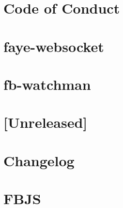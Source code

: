 \documentclass[twoside]{book}
\newcommand{\+}{\discretionary{\mbox{\scriptsize$\hookleftarrow$}}{}{}}
\begin{document}
\chapter{Code of Conduct}
\label{md__c_1_workspace_demo_src_main_script_node_modules_faye-websocket__c_o_d_e__o_f__c_o_n_d_u_c_t}

\chapter{faye-\/websocket}
\label{md__c_1_workspace_demo_src_main_script_node_modules_faye-websocket__r_e_a_d_m_e}

\chapter{fb-\/watchman}
\label{md__c_1_workspace_demo_src_main_script_node_modules_fb-watchman__r_e_a_d_m_e}

\chapter{\mbox{[}Unreleased\mbox{]}}
\label{md__c_1_workspace_demo_src_main_script_node_modules_fbjs__c_h_a_n_g_e_l_o_g}

\chapter{Changelog}
\label{md__c_1_workspace_demo_src_main_script_node_modules_fbjs_node_modules_core-js__c_h_a_n_g_e_l_o_g}

\chapter{F\+B\+JS}
\label{md__c_1_workspace_demo_src_main_script_node_modules_fbjs__r_e_a_d_m_e}

\end{document}
